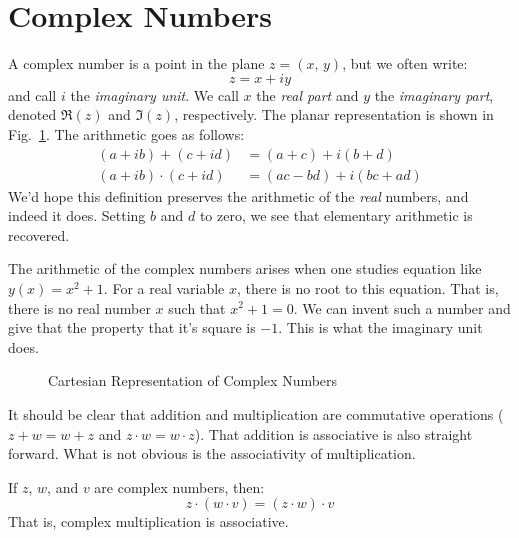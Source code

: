 \section{Complex Numbers}
    A \gls{complex number} is a point in the plane $z=(x,\,y)$,
    but we often write:
    \begin{equation}
        z=x+iy
    \end{equation}
    and call $i$ the \textit{imaginary unit}. We call $x$ the
    \textit{real part} and $y$ the \textit{imaginary part}, denoted
    $\Re(z)$ and $\Im(z)$, respectively. The planar representation
    is shown in Fig.~\ref{fig:Cart_Rep_of_Comp_Num}.
    The arithmetic goes as follows:
    \begin{subequations}
        \begin{align}
            \label{eqn:Complex_Addition}%
            (a+ib)+(c+id)&=(a+c)+i(b+d)\\
            \label{eqn:Complex_Multiplication}%
            (a+ib)\cdot(c+id)&=(ac-bd)+i(bc+ad)
        \end{align}
    \end{subequations}
    We'd hope this definition preserves the arithmetic of the
    \textit{real} numbers, and indeed it does. Setting $b$ and $d$
    to zero, we see that elementary arithmetic is recovered.
    \par\hfill\par
    The arithmetic of the complex numbers arises when one studies equation
    like $y(x)=x^{2}+1$. For a real variable $x$, there is no root to this
    equation. That is, there is no real number $x$ such that $x^{2}+1=0$.
    We can invent such a number and give that the property that it's square
    is $\minus{1}$. This is what the imaginary unit does.
    \begin{figure}[H]
        \centering
        \captionsetup{type=figure}
        
        \caption{Cartesian Representation of Complex Numbers}
        \label{fig:Cart_Rep_of_Comp_Num}
    \end{figure}
    It should be clear  that addition and multiplication are commutative
    operations ($z+w=w+z$ and $z\cdot{w}=w\cdot{z}$). That addition
    is associative is also straight forward. What is not
    obvious is the associativity of multiplication.
    \begin{theorem}
        \label{thm:Complex_Multiplication_Associative}%
        If $z$, $w$, and $v$ are complex numbers, then:
        \begin{equation}
            z\cdot(w\cdot{v})=(z\cdot{w})\cdot{v}
        \end{equation}
        That is, complex multiplication is associative.
    \end{theorem}
